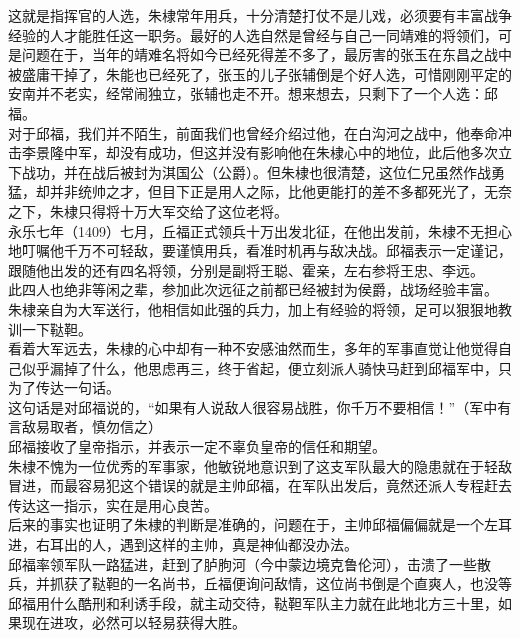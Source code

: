 \begin{multicols}{\theparacolNo}
这就是指挥官的人选，朱棣常年用兵，十分清楚打仗不是儿戏，必须要有丰富战争经验的人才能胜任这一职务。最好的人选自然是曾经与自己一同靖难的将领们，可是问题在于，当年的靖难名将如今已经死得差不多了，最厉害的张玉在东昌之战中被盛庸干掉了，朱能也已经死了，张玉的儿子张辅倒是个好人选，可惜刚刚平定的安南并不老实，经常闹独立，张辅也走不开。想来想去，只剩下了一个人选：邱福。\\

对于邱福，我们并不陌生，前面我们也曾经介绍过他，在白沟河之战中，他奉命冲击李景隆中军，却没有成功，但这并没有影响他在朱棣心中的地位，此后他多次立下战功，并在战后被封为淇国公（公爵）。但朱棣也很清楚，这位仁兄虽然作战勇猛，却并非统帅之才，但目下正是用人之际，比他更能打的差不多都死光了，无奈之下，朱棣只得将十万大军交给了这位老将。\\

永乐七年（1409）七月，丘福正式领兵十万出发北征，在他出发前，朱棣不无担心地叮嘱他千万不可轻敌，要谨慎用兵，看准时机再与敌决战。邱福表示一定谨记，跟随他出发的还有四名将领，分别是副将王聪、霍亲，左右参将王忠、李远。\\

此四人也绝非等闲之辈，参加此次远征之前都已经被封为侯爵，战场经验丰富。\\

朱棣亲自为大军送行，他相信如此强的兵力，加上有经验的将领，足可以狠狠地教训一下鞑靼。\\

看着大军远去，朱棣的心中却有一种不安感油然而生，多年的军事直觉让他觉得自己似乎漏掉了什么，他思虑再三，终于省起，便立刻派人骑快马赶到邱福军中，只为了传达一句话。\\

这句话是对邱福说的，“如果有人说敌人很容易战胜，你千万不要相信！”（军中有言敌易取者，慎勿信之）\\

邱福接收了皇帝指示，并表示一定不辜负皇帝的信任和期望。\\

朱棣不愧为一位优秀的军事家，他敏锐地意识到了这支军队最大的隐患就在于轻敌冒进，而最容易犯这个错误的就是主帅邱福，在军队出发后，竟然还派人专程赶去传达这一指示，实在是用心良苦。\\

后来的事实也证明了朱棣的判断是准确的，问题在于，主帅邱福偏偏就是一个左耳进，右耳出的人，遇到这样的主帅，真是神仙都没办法。\\

邱福率领军队一路猛进，赶到了胪朐河（今中蒙边境克鲁伦河），击溃了一些散兵，并抓获了鞑靼的一名尚书，丘福便询问敌情，这位尚书倒是个直爽人，也没等邱福用什么酷刑和利诱手段，就主动交待，鞑靼军队主力就在此地北方三十里，如果现在进攻，必然可以轻易获得大胜。\\


\end{multicols}
